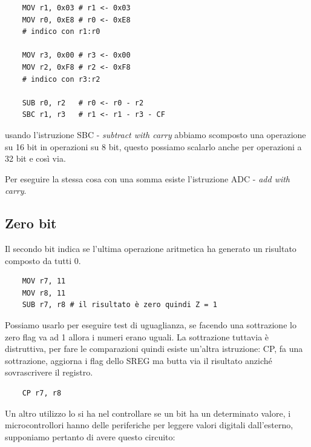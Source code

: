 \begin{verbatim}
    MOV r1, 0x03 # r1 <- 0x03
    MOV r0, 0xE8 # r0 <- 0xE8
    # indico con r1:r0
    
    MOV r3, 0x00 # r3 <- 0x00
    MOV r2, 0xF8 # r2 <- 0xF8
    # indico con r3:r2
    
    SUB r0, r2   # r0 <- r0 - r2
    SBC r1, r3   # r1 <- r1 - r3 - CF
\end{verbatim}
usando l'istruzione SBC - \emph{subtract with carry} abbiamo scomposto una operazione su 16 bit in operazioni su 8 bit, questo possiamo scalarlo anche per operazioni a 32 bit e così via.

Per eseguire la stessa cosa con una somma esiste l'istruzione ADC - \emph{add with carry}.

\subsection{Zero bit}
Il secondo bit indica se l'ultima operazione aritmetica ha generato un risultato composto da tutti 0.
\begin{verbatim}
    MOV r7, 11
    MOV r8, 11
    SUB r7, r8 # il risultato è zero quindi Z = 1
\end{verbatim}

Possiamo usarlo per eseguire test di uguaglianza, se facendo una sottrazione lo zero flag va ad 1 allora i numeri erano uguali. La sottrazione tuttavia è distruttiva, per fare le comparazioni quindi esiste un'altra istruzione: CP, fa una sottrazione, aggiorna i flag dello SREG ma butta via il risultato anziché sovrascrivere il registro.
\begin{verbatim}
    CP r7, r8
\end{verbatim}

Un altro utilizzo lo si ha nel controllare se un bit ha un determinato valore, i microcontrollori hanno delle periferiche per leggere valori digitali dall'esterno, supponiamo pertanto di avere questo circuito:

